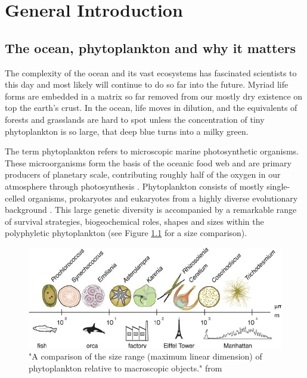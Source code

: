 \chapter{General Introduction}

\section{The ocean, phytoplankton and why it matters}
The complexity of the ocean and its vast ecosystems has fascinated scientists to this day and most likely will continue to do so far into the future. Myriad life forms are embedded in a matrix so far removed from our mostly dry existence on top the earth’s crust. In the ocean, life moves in dilution, and the equivalents of forests and grasslands are hard to spot unless the concentration of tiny phytoplankton is so large, that deep blue turns into a milky green.

The term phytoplankton refers to microscopic marine photosynthetic organisms. These microorganisms form the basis of the oceanic food web and are primary producers of planetary scale, contributing roughly half of the oxygen in our atmosphere through photosynthesis \citep{Field2009}. Phytoplankton consists of mostly single-celled organisms, prokaryotes and eukaryotes from a highly diverse evolutionary background \citep{Falkowski2004a}. This large genetic diversity is accompanied by a remarkable range of survival strategies, biogeochemical roles, shapes and sizes within the polyphyletic phytoplankton (see Figure \ref{FinkelPhySizeRange} for a size comparison).

\begin{figure}
\centering
\includegraphics[trim = 0mm 0mm 0mm 0mm, clip, width=.9\linewidth]{./Chp1-Intro/SIZEphytoComparison_FinkelEtAl2010.png}
\caption[Scheme]{\small {"A comparison of the size range (maximum linear dimension) of phytoplankton
relative to macroscopic objects." from \cite{Finkel2010}}}
\label{FinkelPhySizeRange}
\end{figure}

